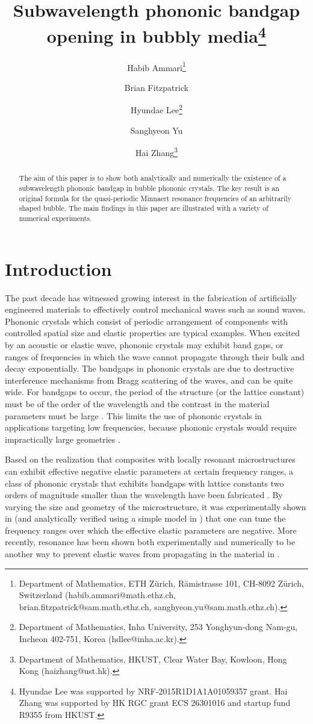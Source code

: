 \documentclass[11pt]{article}
\title{Subwavelength phononic bandgap opening in bubbly media\thanks{\footnotesize Hyundae Lee was supported by NRF-2015R1D1A1A01059357 grant.  Hai Zhang was supported by HK RGC grant ECS 26301016 and 
startup fund R9355 from HKUST.}}
\date{}
\author{
Habib Ammari\thanks{\footnotesize Department of Mathematics, 
ETH Z\"urich, 
R\"amistrasse 101, CH-8092 Z\"urich, Switzerland (habib.ammari@math.ethz.ch, brian.fitzpatrick@sam.math.ethz.ch, sanghyeon.yu@sam.math.ethz.ch).} \and Brian Fitzpatrick\footnotemark[2] 
\and Hyundae Lee\thanks{\footnotesize  Department of Mathematics, Inha University,  253 Yonghyun-dong Nam-gu,  Incheon 402-751,  Korea (hdlee@inha.ac.kr).}  \and Sanghyeon Yu\footnotemark[2]  \and Hai Zhang\thanks{\footnotesize 
Department of Mathematics, 
 HKUST,  Clear Water Bay, Kowloon, Hong Kong (haizhang@ust.hk).}}
\numberwithin{equation}{section}
\newcommand\1{{\ensuremath {\mathds 1} }}
\begin{document}
\maketitle

\begin{abstract}
The aim of this paper is to show both analytically and numerically the existence of a subwavelength phononic bandgap in bubble phononic crystals. The key result is an original formula for the quasi-periodic Minnaert resonance frequencies of an arbitrarily shaped bubble. The main findings in this paper are illustrated with a variety of numerical experiments. 
\end{abstract}

\medskip


\bigskip







\section{Introduction} \label{sec-intro}

The past decade has witnessed growing interest in the fabrication of artificially engineered materials
to effectively control mechanical waves such as sound waves.  Phononic crystals which consist of periodic arrangement of components with controlled spatial size and elastic properties are typical examples. When excited by an acoustic or elastic wave, phononic crystals may exhibit band gaps, or ranges of frequencies in which the wave cannot propagate through their bulk and decay exponentially. The bandgaps in phononic crystals are due to destructive interference mechanisms from Bragg scattering of the waves, and can be quite wide. For bandgaps to occur, the period of the structure (or the lattice constant) must be of the order of the wavelength and the contrast in the material parameters must be large \cite{Ammari2009_book,  arma, soussi, figotin, hempel, Lipton}. This limits the use of phononic crystals in applications targeting low frequencies, because phononic crystals would require impractically large geometries \cite{pnas,nature}. 

Based on the realization that composites with locally resonant microstructures can exhibit effective negative elastic parameters at certain frequency ranges, a class of phononic crystals that exhibits bandgaps with lattice constants two orders of magnitude smaller than the wavelength have been fabricated \cite{phononic1}. By varying the size and geometry of the microstructure, it was experimentally shown in \cite{phononic1} (and analytically verified using a simple model in \cite{phononic2}) that one can tune the frequency ranges over which the effective elastic parameters are negative. More recently, resonance has been shown both experimentally and numerically to be another way to prevent elastic waves from propagating in the material in \cite{pnas}. 
\end{document}
